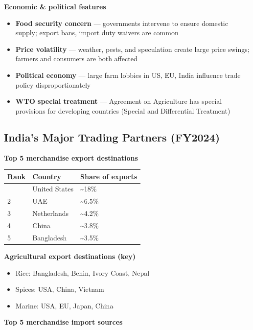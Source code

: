 \documentclass[
  letterpaper,
  DIV=11,
  numbers=noendperiod]{scrartcl}
\providecommand{\tightlist}{%
  \setlength{\itemsep}{0pt}\setlength{\parskip}{0pt}}
\begin{document}
\textbf{Economic \& political features}

\begin{itemize}
\tightlist
\item
  \textbf{Food security concern} --- governments intervene to ensure
  domestic supply; export bans, import duty waivers are common
\item
  \textbf{Price volatility} --- weather, pests, and speculation create
  large price swings; farmers and consumers are both affected
\item
  \textbf{Political economy} --- large farm lobbies in US, EU, India
  influence trade policy disproportionately
\item
  \textbf{WTO special treatment} --- Agreement on Agriculture has
  special provisions for developing countries (Special and Differential
  Treatment)
\end{itemize}

\subsection{India's Major Trading Partners
(FY2024)}\label{indias-major-trading-partners-fy2024}

\textbf{Top 5 merchandise export destinations}

\begin{longtable}[]{@{}lll@{}}
\toprule\noalign{}
Rank & Country & Share of exports \\
\midrule\noalign{}
\endhead
\bottomrule\noalign{}
\endlastfoot
1 & United States & \textasciitilde18\% \\
2 & UAE & \textasciitilde6.5\% \\
3 & Netherlands & \textasciitilde4.2\% \\
4 & China & \textasciitilde3.8\% \\
5 & Bangladesh & \textasciitilde3.5\% \\
\end{longtable}

\textbf{Agricultural export destinations (key)}

\begin{itemize}
\tightlist
\item
  Rice: Bangladesh, Benin, Ivory Coast, Nepal
\item
  Spices: USA, China, Vietnam
\item
  Marine: USA, EU, Japan, China
\end{itemize}

\textbf{Top 5 merchandise import sources}
\end{document}
